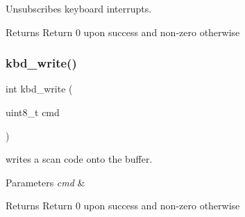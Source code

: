 Unsubscribes keyboard interrupts. 

\begin{DoxyReturn}{Returns}
Return 0 upon success and non-\/zero otherwise 
\end{DoxyReturn}
\mbox{\label{group__keyboard_ga86798e38df77561e5a7a8d09fc28014b}} 
\subsubsection{\texorpdfstring{kbd\_write()}{kbd\_write()}}
{\footnotesize\ttfamily int kbd\+\_\+write (\begin{DoxyParamCaption}\item[{uint8\+\_\+t}]{cmd }\end{DoxyParamCaption})}



writes a scan code onto the buffer. 


\begin{DoxyParams}{Parameters}
{\em cmd} & \\
\hline
\end{DoxyParams}
\begin{DoxyReturn}{Returns}
Return 0 upon success and non-\/zero otherwise 
\end{DoxyReturn}
